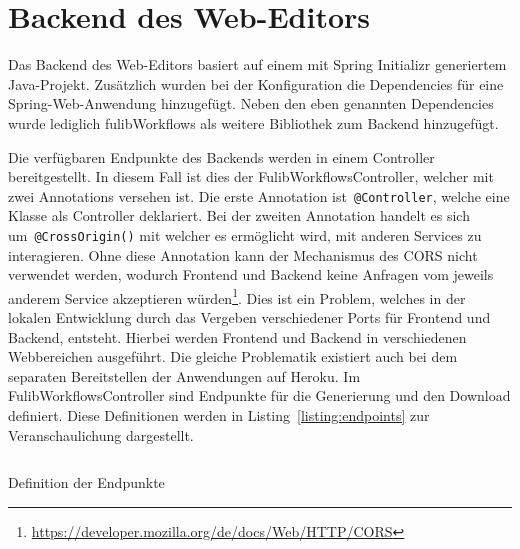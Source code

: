 \section{Backend des Web-Editors}\label{sec:editor-backend}
Das Backend des Web-Editors basiert auf einem mit Spring Initializr generiertem Java-Projekt.
Zusätzlich wurden bei der Konfiguration die Dependencies für eine Spring-Web-Anwendung hinzugefügt.
Neben den eben genannten Dependencies wurde lediglich fulibWorkflows als weitere Bibliothek zum Backend hinzugefügt.

Die verfügbaren Endpunkte des Backends werden in einem Controller bereitgestellt.
In diesem Fall ist dies der FulibWorkflowsController, welcher mit zwei Annotations versehen ist.
Die erste Annotation ist~\texttt{@Controller}, welche eine Klasse als Controller deklariert.
Bei der zweiten Annotation handelt es sich um~\texttt{@CrossOrigin()} mit welcher es ermöglicht wird, mit anderen Services zu interagieren.
Ohne diese Annotation kann der Mechanismus des \ac{CORS} nicht verwendet werden, wodurch Frontend und Backend
keine Anfragen vom jeweils anderem Service akzeptieren würden\footnote{\url{https://developer.mozilla.org/de/docs/Web/HTTP/CORS}}.
Dies ist ein Problem, welches in der lokalen Entwicklung durch das Vergeben verschiedener Ports für Frontend und Backend, entsteht.
Hierbei werden Frontend und Backend in verschiedenen Webbereichen ausgeführt.
Die gleiche Problematik existiert auch bei dem separaten Bereitstellen der Anwendungen auf Heroku.
Im FulibWorkflowsController sind Endpunkte für die Generierung und den Download definiert.
Diese Definitionen werden in Listing~\ref{listing:endpoints} zur Veranschaulichung dargestellt.

\begin{listing}[!ht]
    \inputminted[firstnumber=15]{java}{listings/3.3/Endpoints.java}
    \caption{Definition der Endpunkte}
    \label{listing:endpoints}
\end{listing}

